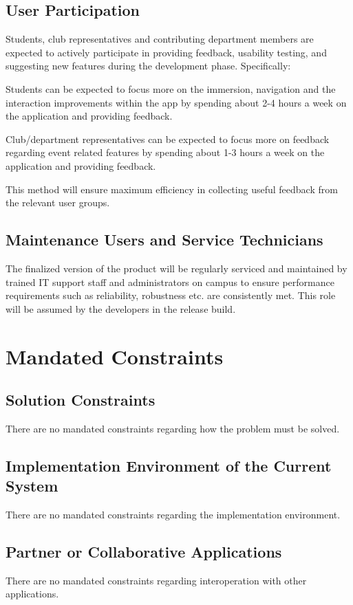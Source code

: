 \documentclass[12pt]{article}
\begin{document}
\subsection{User Participation}

\quad Students, club representatives and contributing department members are expected to actively participate in providing feedback, usability testing, and suggesting new features during the development phase. Specifically:


Students can be expected to focus more on the immersion, navigation and the interaction improvements within the app by spending about 2-4 hours a week on the application and providing feedback.


Club/department representatives can be expected to focus more on feedback regarding event related features by spending about 1-3 hours a week on the application and providing feedback.


This method will ensure maximum efficiency in collecting useful feedback from the relevant user groups.

\subsection{Maintenance Users and Service Technicians}

The finalized version of the product will be regularly serviced and maintained by trained IT support staff and administrators on campus to ensure performance requirements such as reliability, robustness etc. are consistently met. This role will be assumed by the developers in the release build.

\section{Mandated Constraints}
\subsection{Solution Constraints}
There are no mandated constraints regarding how the problem must be solved.
\subsection{Implementation Environment of the Current System}
There are no mandated constraints regarding the implementation environment.
\subsection{Partner or Collaborative Applications}
There are no mandated constraints regarding interoperation with other applications.
\end{document}
